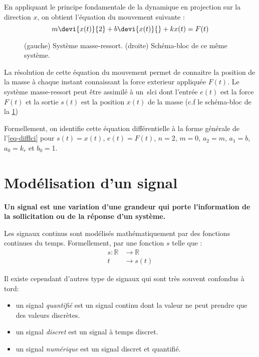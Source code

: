 En appliquant le principe fondamentale de la dynamique en projection 
sur la direction $x$, on obtient l'équation du mouvement suivante :
$$
m\devi{x(t)}{2}+b\devi{x(t)}{}+kx(t)=F(t)
$$
\begin{figure}[!h]
    \centering
    
    \caption{(gauche) Système masse-ressort. (droite) Schéma-bloc de ce même 
    système.
    \label{fig-masse-ressort}}
\end{figure}

La résolution de cette équation du mouvement permet de connaitre la position 
de la masse à chaque instant connaissant la force exterieur 
appliquée $F(t)$. Le système masse-ressort peut être assimilé à un~\gls{slci} 
dont l'entrée $e(t)$ est la force $F(t)$ et la sortie $s(t)$ est la 
position $x(t)$ de la masse (c.f le schéma-bloc de la \cref{fig-masse-ressort})

Formellement, on identifie cette équation différentielle à la forme générale 
de l'\cref{eq-difflci} pour $s(t)=x(t)$, $e(t)=F(t)$, 
$n=$2, $m=0$, $a_2=m$, $a_1=b$, $a_0=k_r$ et $b_0=$1.


\section{Modélisation d'un signal}
\textbf{Un signal est une variation d'une grandeur qui porte l'information 
de la sollicitation ou de la réponse d'un système.}

Les signaux continus sont modélisés mathématiquement par des fonctions 
continues du temps. Formellement, par une fonction $s$ telle que :
\begin{align*}
s : \mathbb{R}&\rightarrow\mathbb{R} \\  
t&\rightarrow s(t) 
\end{align*}    

Il existe cependant d'autres type de signaux qui sont très souvent confondus 
à tord:
\begin{itemize}
    \item un signal \emph{quantifié} est un signal continu 
          dont la valeur ne peut prendre que des valeurs discrètes. 
    \item un signal \emph{discret} est un signal à temps discret.
    \item un signal \emph{numérique} est un signal discret et quantifié.   
\end{itemize}

